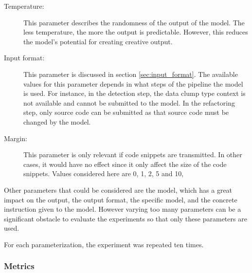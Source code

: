 \begin{description}
	\item [Temperature:] This parameter describes the randomness of the output of the model. The less temperature, the more the output is predictable. However, this reduces the model's potential for creating creative output.
	
	
	\item [Input format:] This parameter is discussed in section \ref{sec:input_format}. The available values for this parameter depends in what steps of the pipeline the model is used. For instance, in the detection step, the data clump type context is not available and cannot be submitted to the model. In the refactoring step, only source code can be submitted as that source code must be changed by the model.
	
	\item [Margin:] This parameter is only relevant if code snippets are transmitted. In other cases, it would have no effect since it only affect the size of the code snippets. Values considered here are 0, 1, 2, 5 and 10, 
	
	
\end{description}

Other parameters that could be considered are the model, which has a great impact on the output, the output format, the specific model, and the concrete instruction given to the model. However varying too many parameters can be a significant obstacle to evaluate the experiments so that only these parameters are used. 

For each parameterization, the experiment was repeated ten times. 



\subsubsection{Metrics}

